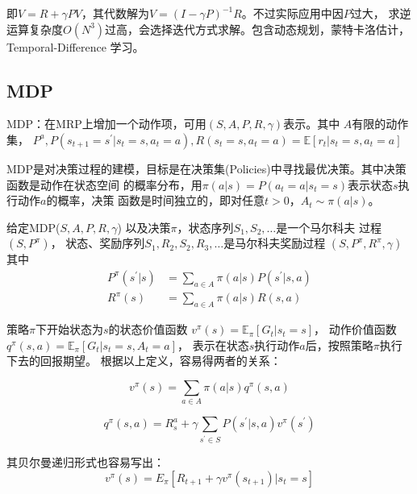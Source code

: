 \documentclass[UTF8]{ctexart}
\begin{document}
即$V=R+\gamma P V$，其代数解为$V=(I-\gamma P)^{-1} R$。不过实际应用中因$P$过大，
求逆运算复杂度$O\left(N^{3}\right)$过高，会选择迭代方式求解。包含动态规划，蒙特卡洛估计，
Temporal-Difference 学习。

\subsection{MDP}
MDP：在MRP上增加一个动作项，可用$(S, A, P, R, \gamma)$表示。其中
$A$有限的动作集，
$P^{a}, P\left(s_{t+1}=s^{\prime} | s_{t}=s, a_{t}=a\right), 
R\left(s_{t}=s, a_{t}=a\right)=\mathbb{E}\left[r_{t} | s_{t}=s, a_{t}=a\right]$

MDP是对决策过程的建模，目标是在决策集(Policies)中寻找最优决策。其中决策函数是动作在状态空间
的概率分布，用$\pi(a | s)=P\left(a_{t}=a | s_{t}=s\right)$表示状态$s$执行动作$a$的概率，决策
函数是时间独立的，即对任意$t>0$，$A_{t} \sim \pi(a | s)$。

给定MDP($S, A, P, R, \gamma$) 以及决策$\pi$，状态序列$S_1, S_2, \ldots $是一个马尔科夫
过程$(S, P^{\pi})$， 状态、奖励序列$S_1, R_2, S_2, R_3, \ldots$是马尔科夫奖励过程
$(S, P^{\pi}, R^{\pi}, \gamma)$
其中
$$\begin{aligned}
    P^{\pi}\left(s^{\prime} | s\right) &=\sum_{a \in A} \pi(a | s) P\left(s^{\prime} | s, a\right) \\
    R^{\pi}(s) &=\sum_{a \in A} \pi(a | s) R(s, a)
    \end{aligned}
$$


策略$\pi$下开始状态为$s$的状态价值函数
$v^{\pi}(s)=\mathbb{E}_{\pi}\left[G_{t} | s_{t}=s\right]$，
动作价值函数
$q^{\pi}(s, a)=\mathbb{E}_{\pi}\left[G_{t} | s_{t}=s, A_{t}=a\right]$，
表示在状态$s$执行动作$a$后，按照策略$\pi$执行下去的回报期望。
根据以上定义，容易得两者的关系：

\begin{equation}
   v^{\pi}(s)=\sum_{a \in A} \pi(a | s) q^{\pi}(s, a)
\end{equation}

\begin{equation}\label{qsav}
    q^{\pi}(s, a)=R_{s}^{a}+\gamma \sum_{s^{\prime} \in S} P\left(s^{\prime} | s, a\right) v^{\pi}\left(s^{\prime}\right)
\end{equation}


其贝尔曼递归形式也容易写出：
\begin{equation}
v^{\pi}(s)=E_{\pi}\left[R_{t+1}+\gamma v^{\pi}\left(s_{t+1}\right) | s_{t}=s\right]
\end{equation}
\end{document}
